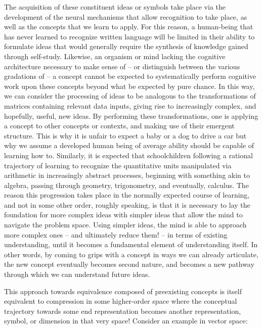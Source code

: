The acquisition of these constituent ideas or symbols take place via the development of the neural mechanisms that allow recognition to take place, as well as the concepts that we learn to apply. For this reason, a human-being that has never learned to recognize written language will be limited in their ability to formulate ideas that would generally require the synthesis of knowledge gained through self-study. Likewise, an organism or mind lacking the cognitive architecture necessary to make sense of -- or distinguish between the various gradations of -- a concept cannot be expected to systematically perform cognitive work upon these concepts beyond what be expected by pure chance. In this way, we can consider the processing of ideas to be analogous to the transformations of matrices containing relevant data inputs, giving rise to increasingly complex, and hopefully, useful, new ideas. By performing these transformations, one is applying a concept to other concepts or contexts, and making use of their emergent structure. This is why it is unfair to expect a baby or a dog to drive a car but why we assume a developed human being of average ability should be capable of learning how to. Similarly, it is expected that schoolchildren following a rational trajectory of learning to recognize the quantitative units manipulated via arithmetic in increasingly abstract processes, beginning with something akin to algebra, passing through geometry, trigonometry, and eventually, calculus. The reason this progression takes place in the normally expected course of learning, and not in some other order, roughly speaking, is that it is necessary to lay the foundation for more complex ideas with simpler ideas that allow the mind to navigate the problem space. Using simpler ideas, the mind is able to approach more complex ones -- and ultimately reduce them! -- in terms of existing understanding, until it becomes a fundamental element of understanding itself. In other words, by coming to grips with a concept in ways we can already articulate, the new concept eventually becomes second nature, and becomes a new pathway through which we can understand future ideas.

This approach towards equivalence composed of preexisting concepts is itself equivalent to compression in some higher-order space where the conceptual trajectory towards some end representation becomes another representation, symbol, or dimension in that very space! Consider an example in vector space:

